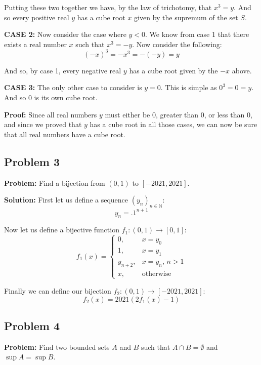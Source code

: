 \documentclass{article}
\newcommand{\N}{\mathbb N}
\begin{document}
Putting these two together we have, by the law of trichotomy, that $x^3=y$. And so every positive real $y$ has a cube root $x$ given by the supremum of the set $S$.
\medskip

\textbf{CASE 2:} Now consider the case where $y<0$. We know from case 1 that there exists a real number $x$ such that $x^3=-y$. Now consider the following:
\begin{equation*}
  (-x)^3=-x^3=-(-y)=y
\end{equation*}

And so, by case 1, every negative real $y$ has a cube root given by the $-x$ above.
\medskip

\textbf{CASE 3:} The only other case to consider is $y=0$. This is simple as $0^3=0=y$. And so 0 is its own cube root.
\medskip

\textbf{Proof:} Since all real numbers $y$ must either be 0, greater than 0, or less than 0, and since we proved that $y$ has a cube root in all those cases, we can now be sure that all real numbers have a cube root.

\subsection*{Problem 3}
\noindent\textbf{Problem:} Find a bijection from $(0,1)$ to $[-2021,2021]$.
\bigskip

\noindent\textbf{Solution:} First let us define a sequence $(y_n)_{n\in\N}$:
\begin{equation*}
  y_n=.1^{n+1}
\end{equation*}

Now let us define a bijective function $f_1:(0,1)\to[0,1]$:
\begin{equation*}
  f_1(x)=\begin{cases}
    0, &x=y_0\\
    1, &x=y_1\\
    y_{n+2},&x=y_n,\,n>1\\
    x,&\text{otherwise}
  \end{cases}
\end{equation*}

Finally we can define our bijection $f_2:(0,1)\to[-2021,2021]$:
\begin{equation*}
  f_2(x)=2021(2f_1(x)-1)
\end{equation*}

\subsection*{Problem 4}
\noindent\textbf{Problem:} Find two bounded sets $A$ and $B$ such that $A\cap B=\emptyset$ and $\sup A=\sup B$.
\bigskip
\end{document}
